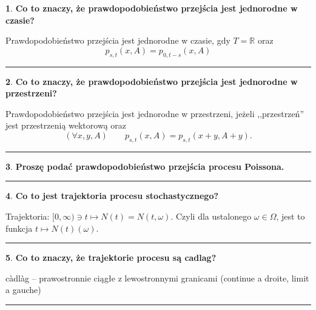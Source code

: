 \documentclass[
    twocolumn,
    twoside,
    fontsize=11pt,
    paper=A0,
    DIV=30
]{scrartcl}
\theoremstyle{definition}
\newtheorem{pytanie}{}
\theoremstyle{break}
\newenvironment{odpowiedź}{\vspace{-0.7em}}{\vspace{0.3em}\hrule}
\begin{document}
\begin{pytanie}
\textbf{Co to znaczy, że prawdopodobieństwo przejścia jest jednorodne w czasie?}
\end{pytanie}
\begin{odpowiedź}
    Prawdopodobieństwo przejścia jest jednorodne w czasie,
    gdy $T=\mathbb{R}$ oraz
    \[p_{s, t} (x,A) = p_{0, t-s} (x,A)\]
\end{odpowiedź}


\begin{pytanie}
\textbf{Co to znaczy, że prawdopodobieństwo przejścia jest jednorodne w przestrzeni?}
\end{pytanie}
\begin{odpowiedź}
    Prawdopodobieństwo przejścia jest jednorodne w przestrzeni,
    jeżeli ,,przestrzeń'' jest przestrzenią wektorową oraz \[
        (\forall x, y, A) \qquad p_{s, t}(x, A) = p_{s, t}(x + y, A + y).
    \] 
\end{odpowiedź}


\begin{pytanie}
\textbf{Proszę podać prawdopodobieństwo przejścia procesu Poissona.}
\end{pytanie}
\begin{odpowiedź}
\end{odpowiedź}


\begin{pytanie}
\textbf{Co to jest trajektoria procesu stochastycznego?}
\end{pytanie}
\begin{odpowiedź}
    Trajektoria: $[0, \infty) \ni t \mapsto N(t) = N(t, \omega)$.
    Czyli dla ustalonego $\omega \in \Omega$, jest to funkcja
    $t \mapsto N(t)(\omega)$.
\end{odpowiedź}


\begin{pytanie}
\textbf{Co to znaczy, że trajektorie procesu są cadlag?}
\end{pytanie}
\begin{odpowiedź}
    càdlàg – prawostronnie ciągłe z lewostronnymi granicami
    (continue a droite, limit a gauche)
\end{odpowiedź}
\end{document}
